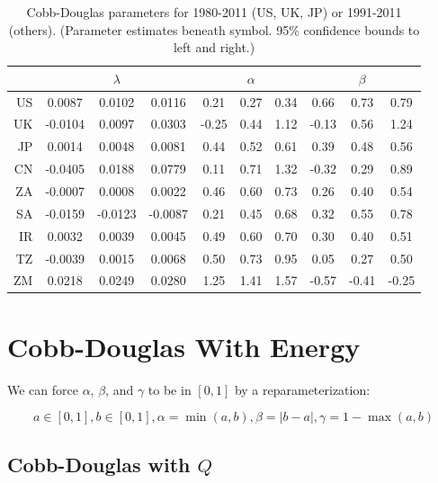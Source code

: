 \documentclass[preprint,authoryear,12pt]{elsarticle}\usepackage{graphicx, color}
\begin{document}
\begin{table}[ht]
\begin{center}
\caption{Cobb-Douglas parameters for 1980-2011 (US, UK, JP) or 1991-2011 (others). (Parameter estimates beneath symbol. 95\% confidence bounds to left and right.)}
\begin{tabular}{r|ccc|ccc|ccc}
  \hline
 &   & $\lambda$ &   &   & $\alpha$ &   &   & $\beta$ &   \\ 
  \hline
US & 0.0087 & 0.0102 & 0.0116 & 0.21 & 0.27 & 0.34 & 0.66 & 0.73 & 0.79 \\ 
  UK & -0.0104 & 0.0097 & 0.0303 & -0.25 & 0.44 & 1.12 & -0.13 & 0.56 & 1.24 \\ 
  JP & 0.0014 & 0.0048 & 0.0081 & 0.44 & 0.52 & 0.61 & 0.39 & 0.48 & 0.56 \\ 
  CN & -0.0405 & 0.0188 & 0.0779 & 0.11 & 0.71 & 1.32 & -0.32 & 0.29 & 0.89 \\ 
  ZA & -0.0007 & 0.0008 & 0.0022 & 0.46 & 0.60 & 0.73 & 0.26 & 0.40 & 0.54 \\ 
  SA & -0.0159 & -0.0123 & -0.0087 & 0.21 & 0.45 & 0.68 & 0.32 & 0.55 & 0.78 \\ 
  IR & 0.0032 & 0.0039 & 0.0045 & 0.49 & 0.60 & 0.70 & 0.30 & 0.40 & 0.51 \\ 
  TZ & -0.0039 & 0.0015 & 0.0068 & 0.50 & 0.73 & 0.95 & 0.05 & 0.27 & 0.50 \\ 
  ZM & 0.0218 & 0.0249 & 0.0280 & 1.25 & 1.41 & 1.57 & -0.57 & -0.41 & -0.25 \\ 
   \hline
\end{tabular}
\end{center}
\end{table}



\section{Cobb-Douglas With Energy}

We can force $\alpha$, $\beta$, and $\gamma$ to be in $[0,1]$ by a reparameterization:

\[ a \in[0,1], b \in [0,1], \alpha=\min(a,b), \beta=|b-a|, \gamma = 1-\max(a,b) \]




\subsection{Cobb-Douglas with $Q$}
\end{document}
